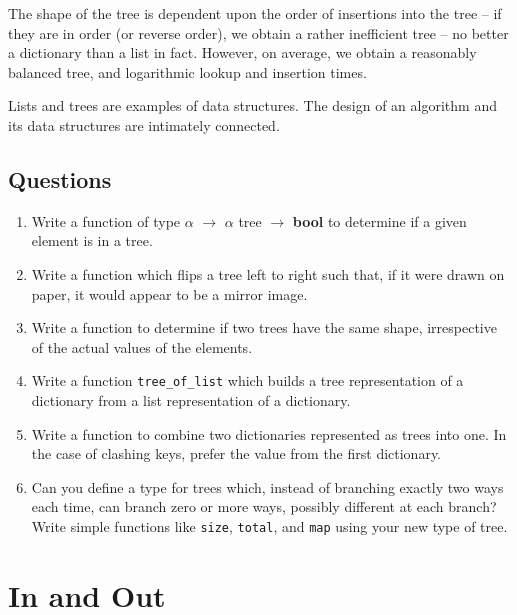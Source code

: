 \documentclass[]{book}
\begin{document}
\noindent The shape of the tree is dependent upon the order of insertions into the tree -- if they are in order (or reverse order), we obtain a rather inefficient tree -- no better a dictionary than a list in fact. However, on average, we obtain a reasonably balanced tree, and logarithmic lookup and insertion times.

Lists and trees are examples of data structures. The design of an algorithm and its data structures are intimately connected. 

\clearpage
\section*{Questions}

\begin{enumerate}
  \item Write a function of type \textsf{$\alpha$ $\rightarrow$ $\alpha$ tree $\rightarrow$ \textbf{bool}} to determine if a given element is in a tree.
  \item Write a function which flips a tree left to right such that, if it were drawn on paper, it would appear to be a mirror image. 
  \item Write a function to determine if two trees have the same shape,
    irrespective of the actual values of the elements. %
  \item Write a function \texttt{tree\_of\_list} which builds a tree representation of a dictionary from a list representation of a dictionary.
  \item Write a function to combine two dictionaries represented as trees into one. In the case of clashing keys, prefer the value from the first dictionary.  \item Can you define a type for trees which, instead of branching exactly two ways each time, can branch zero or more ways, possibly different at each branch? Write simple functions like \texttt{size}, \texttt{total}, and \texttt{map} using your new type of tree.
\end{enumerate}

\cleardoublepage
\thispagestyle{empty}

\pagestyle{empty}


\chapter{In and Out}
\pagestyle{fancy}
\end{document}
